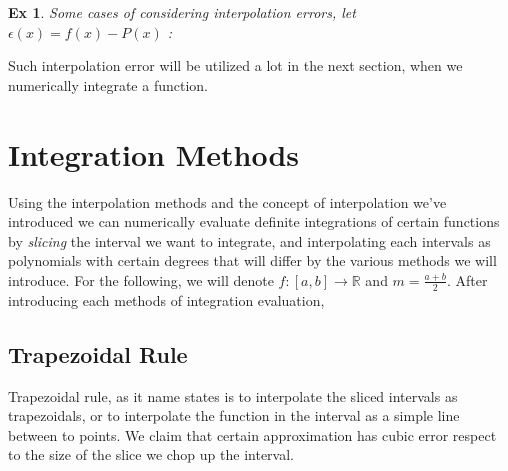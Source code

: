 \documentclass[paper=a4, fontsize=11pt]{scrartcl}
\newtheorem{example}{Ex}
\begin{document}
\begin{example}
Some cases of considering interpolation errors, let $\epsilon(x)=f(x)-P(x)$ :\\
\end{example}

Such interpolation error will be utilized a lot in the next section, when we numerically integrate a function.

\vspace{0.25in}
\section{Integration Methods}
\vspace{0.25in}

Using the interpolation methods and the concept of interpolation we've introduced we can numerically evaluate definite integrations of certain functions by \textit{slicing} the interval we want to integrate, and interpolating each intervals as polynomials with certain degrees that will differ by the various methods we will introduce. For the following, we will denote $f:[a,b]\to\mathbb{R}$ and $m=\frac{a+b}{2}$. After introducing each methods of integration evaluation, 

\vspace{0.15in}
\subsection{Trapezoidal Rule}
\vspace{0.15in}

Trapezoidal rule, as it name states is to interpolate the sliced intervals as trapezoidals, or to interpolate the function in the interval as a simple line between to points. We claim that certain approximation has cubic error respect to the size of the slice we chop up the interval.\\
\end{document}
